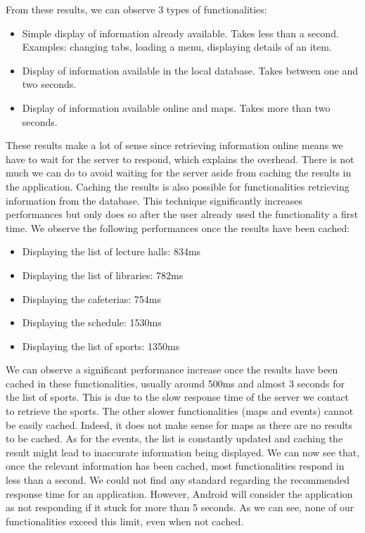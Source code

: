 \documentclass{eplmastersthesis}
\begin{document}
From these results, we can observe 3 types of functionalities:
\begin{itemize}
\item Simple display of information already available. Takes less than a second. Examples: changing tabs, loading a menu, displaying details of an item.
\item Display of information available in the local database. Takes between one and two seconds.
\item Display of information available online and maps. Takes more than two seconds.
\end{itemize}
These results make a lot of sense since retrieving information online means we have to wait for the server to respond, which explains the overhead. There is not much we can do to avoid waiting for the server aside from caching the results in the application. Caching the results is also possible for functionalities retrieving information from the database. This technique significantly increases performances but only does so after the user already used the functionality a first time. We observe the following performances once the results have been cached:
\begin{itemize}
\item Displaying the list of lecture halls: 834ms
\item Displaying the list of libraries: 782ms
\item Displaying the cafeterias: 754ms
\item Displaying the schedule: 1530ms
\item Displaying the list of sports: 1350ms
\end{itemize}
We can observe a significant performance increase once the results have been cached in these functionalities, usually around 500ms and almost 3 seconds for the list of sports. This is due to the slow response time of the server we contact to retrieve the sports. The other slower functionalities (maps and events) cannot be easily cached. Indeed, it does not make sense for maps as there are no results to be cached. As for the events, the list is constantly updated and caching the result might lead to inaccurate information being displayed.
We can now see that, once the relevant information has been cached, most functionalities respond in less than a second. We could not find any standard regarding the recommended response time for an application. However, Android will consider the application as not responding if it stuck for more than 5 seconds. As we can see, none of our functionalities exceed this limit, even when not cached.
\end{document}

